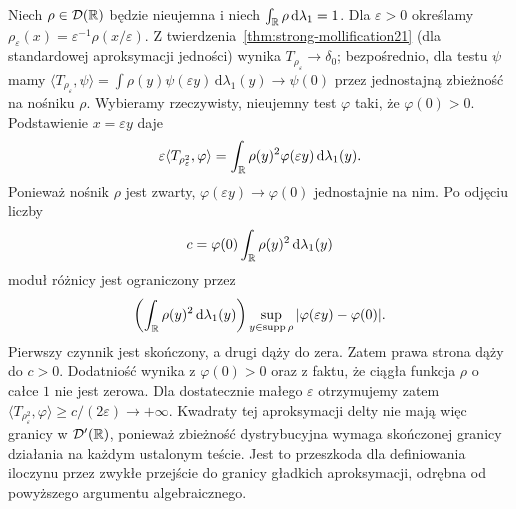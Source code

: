 \begin{przyklad}
\label{ex:dt-delta-square}
Niech $\rho\in\mathcal D(\mathbb R)$ będzie nieujemna
i niech $\int_\mathbb R\rho\,\mathrm d\lambda_1=1$.
Dla $\varepsilon>0$ określamy
$\rho_\varepsilon(x)=\varepsilon^{-1}\rho(x/\varepsilon)$.
Z twierdzenia~\ref{thm:strong-mollification21}
(dla standardowej aproksymacji jedności) wynika
$T_{\rho_\varepsilon}\to\delta_0$; bezpośrednio,
dla testu $\psi$ mamy
$\langle T_{\rho_\varepsilon},\psi\rangle=
\int\rho(y)\psi(\varepsilon y)\,\mathrm d\lambda_1(y)
\to\psi(0)$ przez jednostajną zbieżność na nośniku $\rho$.
Wybieramy rzeczywisty, nieujemny test $\varphi$
taki, że $\varphi(0)>0$.
Podstawienie $x=\varepsilon y$ daje
\[
 \varepsilon\langle T_{\rho_\varepsilon^2},\varphi\rangle
 =\int_\mathbb R \rho(y)^2\varphi(\varepsilon y)\,
 \mathrm d\lambda_1(y).
\]
Ponieważ nośnik $\rho$ jest zwarty,
$\varphi(\varepsilon y)\to\varphi(0)$ jednostajnie
na nim. Po odjęciu liczby
\[
 c=\varphi(0)\int_\mathbb R\rho(y)^2\,\mathrm d\lambda_1(y)
\]
moduł różnicy jest ograniczony przez
\[
 \left(\int_\mathbb R\rho(y)^2\,\mathrm d\lambda_1(y)\right)
 \sup_{y\in\operatorname{supp}\rho}|\varphi(\varepsilon y)-\varphi(0)|.
\]
Pierwszy czynnik jest skończony, a drugi dąży
do zera. Zatem prawa strona dąży do $c>0$.
Dodatniość wynika z $\varphi(0)>0$ oraz z faktu,
że ciągła funkcja $\rho$ o całce $1$ nie jest zerowa.
Dla dostatecznie małego $\varepsilon$ otrzymujemy
zatem
$\langle T_{\rho_\varepsilon^2},\varphi\rangle
\ge c/(2\varepsilon)\to+\infty$.
Kwadraty tej aproksymacji delty nie mają więc
granicy w $\mathcal D'(\mathbb R)$, ponieważ zbieżność
dystrybucyjna wymaga skończonej granicy działania
na każdym ustalonym teście.
Jest to przeszkoda dla definiowania iloczynu
przez zwykłe przejście do granicy gładkich
aproksymacji, odrębna od powyższego argumentu
algebraicznego.
\end{przyklad}
